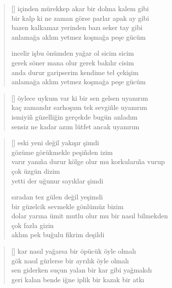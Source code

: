 \documentclass[a5paper, openright, twoside]{memoir}
\begin{document}
\begin{verse}[\versewidth]
  içinden mürekkep akar bir dolma kalem gibi \\
  bir kalp ki ne zaman görse parlar apak ay gibi \\
  bazen kalkamaz yerinden bazı seker tay gibi \\
  anlamağa aklım yetmez koşmağa peşe gücüm

  incelir işbu önümden yağar ol sicim sicim \\
  gerek söner mana olur gerek bakılır cisim \\
  anda durur garipserim kendime tel çekişim \\
  anlamağa aklım yetmez koşmağa peşe gücüm \\
\end{verse}
\begin{verse}[\versewidth]
  öylece uykum var ki bir sen gelsen uyanırım \\
  kaç zamandır sarhoşum tek sevgi\~nle uyanırım \\
  ismiyi\~n güzelliğin gerçekde bugün anladım \\
  sensiz ne kadar azım lütfet ancak uyanırım \\
\end{verse}
\begin{verse}[\versewidth]
  eski yeni değil yakışır şimdi \\
  gözüme görükmekle peşi\~nden izim \\
  varır yanı\~na durur kölge olur mu korkuları\~na vurup \\
  çok üzgün dizim \\
  yetti der uğunur sayıklar şimdi

  sıradan tez gülen değil yeşimdi \\
  bir güzelcik sevmekle gönlümüz bizim \\
  dolar yarına ümit mutlu olur mu bir nasıl bilmekden \\
  çok fazla gizin \\
  aklım pek buğulu fikrim deşildi \\
\end{verse}
\begin{verse}[\versewidth]
  kar nasıl yağarsa bir öpücük öyle olmalı \\
  gök nasıl gürlerse bir ayrılık öyle olmalı \\
  sen giderken suçun yalan bir kar gibi yağmakdı \\
  geri kalan bende iğne iplik bir kazak bir atkı \\
\end{verse}
\end{document}

